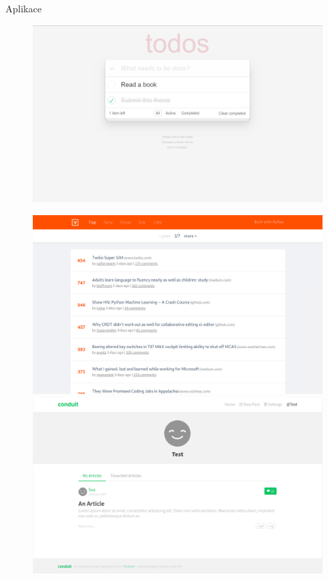 \documentclass[presentation]{beamer}
\begin{document}
\begin{frame}{Aplikace}
  \begin{figure}
    \centering
    \includegraphics[width=.45\linewidth]{../doc-final-thesis/obrazky-figures/screenshot-todomvc.png}
  \end{figure}

  \begin{figure}
    \centering
    \begin{minipage}{.5\textwidth}
      \centering
      \includegraphics[width=.9\linewidth]{../doc-final-thesis/obrazky-figures/screenshot-hnpwa.png}
    \end{minipage}%
    \begin{minipage}{.5\textwidth}
      \centering
      \includegraphics[width=.9\linewidth]{../doc-final-thesis/obrazky-figures/screenshot-realworld.png}
    \end{minipage}
  \end{figure}
\end{frame}
\end{document}
